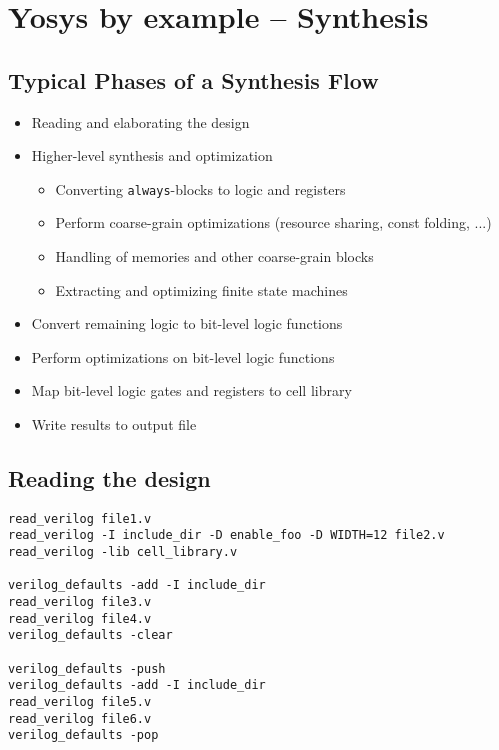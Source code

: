 
\section{Yosys by example -- Synthesis}

\begin{frame}
\sectionpage
\end{frame}


\subsection{Typical Phases of a Synthesis Flow}

\begin{frame}{\subsecname}
\begin{itemize}
\item Reading and elaborating the design
\item Higher-level synthesis and optimization
\begin{itemize}
\item Converting {\tt always}-blocks to logic and registers
\item Perform coarse-grain optimizations (resource sharing, const folding, ...)
\item Handling of memories and other coarse-grain blocks
\item Extracting and optimizing finite state machines
\end{itemize}
\item Convert remaining logic to bit-level logic functions
\item Perform optimizations on bit-level logic functions
\item Map bit-level logic gates and registers to cell library
\item Write results to output file
\end{itemize}
\end{frame}


\subsection{Reading the design}

\begin{frame}[fragile]{\subsecname}
\begin{lstlisting}[xleftmargin=0.5cm, basicstyle=\ttfamily\fontsize{8pt}{10pt}\selectfont, language=ys]
read_verilog file1.v
read_verilog -I include_dir -D enable_foo -D WIDTH=12 file2.v
read_verilog -lib cell_library.v

verilog_defaults -add -I include_dir
read_verilog file3.v
read_verilog file4.v
verilog_defaults -clear

verilog_defaults -push
verilog_defaults -add -I include_dir
read_verilog file5.v
read_verilog file6.v
verilog_defaults -pop
\end{lstlisting}
\end{frame}


